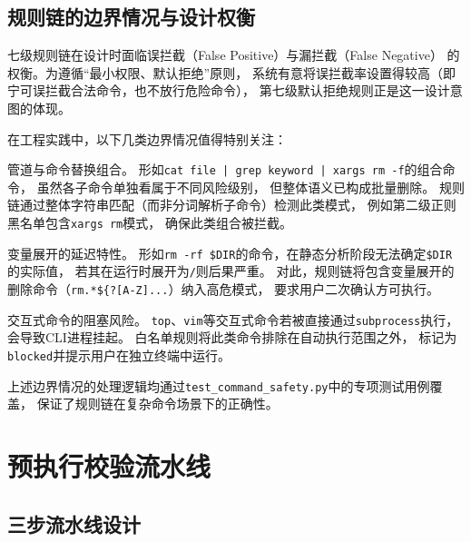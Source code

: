 \subsection{规则链的边界情况与设计权衡}

七级规则链在设计时面临误拦截（False Positive）与漏拦截（False Negative）
的权衡。为遵循“最小权限、默认拒绝”原则，
系统有意将误拦截率设置得较高（即宁可误拦截合法命令，也不放行危险命令），
第七级默认拒绝规则正是这一设计意图的体现。

在工程实践中，以下几类边界情况值得特别关注：

管道与命令替换组合。
形如\texttt{cat file | grep keyword | xargs rm -f}的组合命令，
虽然各子命令单独看属于不同风险级别，
但整体语义已构成批量删除。
规则链通过整体字符串匹配（而非分词解析子命令）检测此类模式，
例如第二级正则黑名单包含\texttt{xargs rm}模式，
确保此类组合被拦截。

变量展开的延迟特性。
形如\texttt{rm -rf \$DIR}的命令，在静态分析阶段无法确定\texttt{\$DIR}的实际值，
若其在运行时展开为\texttt{/}则后果严重。
对此，规则链将包含变量展开的删除命令（\texttt{rm.*\$\{?[A-Z]...}）纳入高危模式，
要求用户二次确认方可执行。

交互式命令的阻塞风险。
\texttt{top}、\texttt{vim}等交互式命令若被直接通过\texttt{subprocess}执行，
会导致CLI进程挂起。
白名单规则将此类命令排除在自动执行范围之外，
标记为\texttt{blocked}并提示用户在独立终端中运行。

上述边界情况的处理逻辑均通过\texttt{test\_command\_safety.py}中的专项测试用例覆盖，
保证了规则链在复杂命令场景下的正确性。

\section{预执行校验流水线}

\subsection{三步流水线设计}

